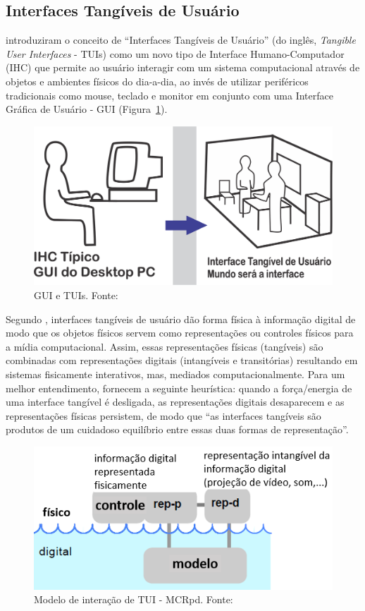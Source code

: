 \subsection{Interfaces Tangíveis de Usuário}\label{section:TUI}

\cite{ishii:1997} introduziram o conceito de ``Interfaces Tangíveis de Usuário'' (do inglês, \textit{Tangible User Interfaces} - TUIs) como um novo tipo de Interface Humano-Computador (IHC) que permite ao usuário interagir com um sistema computacional através de objetos e ambientes físicos do dia-a-dia, ao invés de utilizar periféricos tradicionais como mouse, teclado e monitor em conjunto com uma Interface Gráfica de Usuário - GUI (Figura~\ref{fig:guiandtui}).

\begin{figure}[htb]
	\centering
	\includegraphics[width=0.7\linewidth]{chapters/background/GUIandTUI_redesenhado.png}
	\caption{GUI e TUIs. Fonte:~\cite{ishii:1997}}
	\label{fig:guiandtui}
\end{figure}

Segundo \cite{ullmer:2000}, interfaces tangíveis de usuário dão forma física à informação digital de modo que os objetos físicos servem como representações ou controles físicos para a mídia computacional. Assim, essas representações físicas (tangíveis) são combinadas com representações digitais (intangíveis e transitórias) resultando em sistemas fisicamente interativos, mas, mediados computacionalmente. Para um melhor entendimento, \cite{ullmer:2000} fornecem a seguinte heurística: quando a força/energia de uma interface tangível é desligada, as representações digitais desaparecem e as representações físicas persistem, de modo que ``as interfaces tangíveis são produtos de um cuidadoso equilíbrio entre essas duas formas de representação''.

\begin{figure}[htb]
	\centering
	\includegraphics[width=0.6\linewidth]{chapters/background/MCRpd_2.png}
	\caption{Modelo de interação de TUI - MCRpd. Fonte:~\cite{ullmer:2000}}
	\label{fig:MCRpd}
\end{figure}

